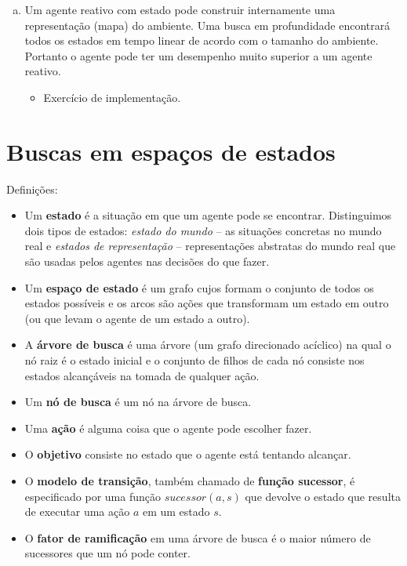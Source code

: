 \begin{solution}
\begin{enumerate}[a.]
	\item Um agente reativo com estado pode construir internamente uma representação (mapa) do ambiente. Uma busca em profundidade encontrará todos os estados em tempo linear de acordo com o tamanho do ambiente. Portanto o agente pode ter um desempenho muito superior a um agente reativo.
	\begin{itemize}
		\item Exercício de implementação.
	\end{itemize}
\end{enumerate}
\end{solution}

\clearpage

\section{Buscas em espaços de estados}

\resetsolutionnumbering

\begin{solution}
Definições:
\begin{itemize}
	\item Um \textbf{estado} é a situação em que um agente pode se encontrar. Distinguimos dois tipos de estados: \textit{estado do mundo} -- as situações concretas no mundo real e \textit{estados de representação} -- representações abstratas do mundo real que são usadas pelos agentes nas decisões do que fazer.
	
	\item Um \textbf{espaço de estado} é um grafo cujos formam o conjunto de todos os estados possíveis e os arcos são ações que transformam um estado em outro (ou que levam o agente de um estado a outro).
	
	\item A \textbf{árvore de busca} é uma árvore (um grafo direcionado acíclico) na qual o nó raiz é o estado inicial e o conjunto de filhos de cada nó consiste nos estados alcançáveis na tomada de qualquer ação.
	
	\item Um \textbf{nó de busca} é um nó na árvore de busca.
	
	\item Uma \textbf{ação} é alguma coisa que o agente pode escolher fazer.
	
	\item O \textbf{objetivo} consiste no estado que o agente está tentando alcançar.
	
	\item O \textbf{modelo de transição}, também chamado de \textbf{função sucessor}, é especificado por uma função $sucessor(a, s)$ que devolve o estado que resulta de executar uma ação $a$ em um estado $s$.
	
	\item O \textbf{fator de ramificação} em uma árvore de busca é o maior número de sucessores que um nó pode conter.
\end{itemize}
\end{solution}

